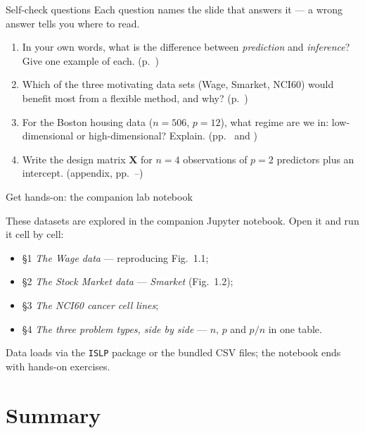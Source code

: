 \documentclass[aspectratio=169,11pt]{beamer}
\begin{document}
\begin{frame}{Self-check questions}
  Each question names the slide that answers it --- a wrong answer tells you
  where to read.
  \begin{enumerate}
    \item In your own words, what is the difference between
          \emph{prediction} and \emph{inference}? Give one example of
          each. (p.~\pageref{frm:predinf})
    \item Which of the three motivating data sets (Wage, Smarket,
          NCI60) would benefit most from a flexible method, and why?
          (p.~\pageref{frm:map})
    \item For the Boston housing data ($n = 506$, $p = 12$), what
          regime are we in: low-dimensional or high-dimensional?
          Explain. (pp.~\pageref{frm:nci60} and \pageref{frm:notation})
    \item Write the design matrix $\mathbf{X}$ for $n = 4$
          observations of $p = 2$ predictors plus an intercept. (appendix, pp.~\pageref{frm:design}--\pageref{frm:anatomy})
  \end{enumerate}
\end{frame}


\begin{frame}{Get hands-on: the companion lab notebook}
  \begin{labnote}
    These datasets are explored in the companion Jupyter notebook. Open it and run it cell by cell:
    \begin{itemize}
      \item \S1 \emph{The Wage data} --- reproducing Fig.~1.1;
      \item \S2 \emph{The Stock Market data} --- \emph{Smarket} (Fig.~1.2);
      \item \S3 \emph{The NCI60 cancer cell lines};
      \item \S4 \emph{The three problem types, side by side} --- $n$, $p$ and $p/n$ in one table.
    \end{itemize}
    Data loads via the \texttt{ISLP} package or the bundled CSV files; the notebook ends with hands-on exercises.
  \end{labnote}
\end{frame}

\section{Summary}
\end{document}
